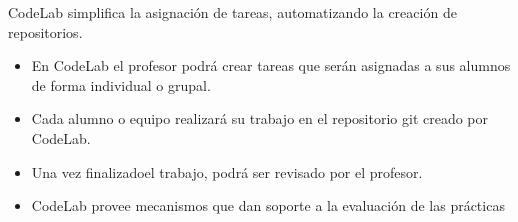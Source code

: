 \documentclass{beamer}
\begin{document}
\begin{frame}
    CodeLab simplifica la asignación de tareas, automatizando la creación de repositorios.
  \begin{itemize}
    \item En CodeLab el profesor podrá crear tareas que serán asignadas a sus alumnos de forma individual o grupal. 
    \item Cada alumno o equipo realizará su trabajo en el repositorio git creado por CodeLab. 
    \item Una vez finalizadoel trabajo, podrá ser revisado por el profesor.
    \item CodeLab provee mecanismos que dan soporte a la evaluación de las prácticas
  \end{itemize}

\end{frame}

%  
  
\end{document}
